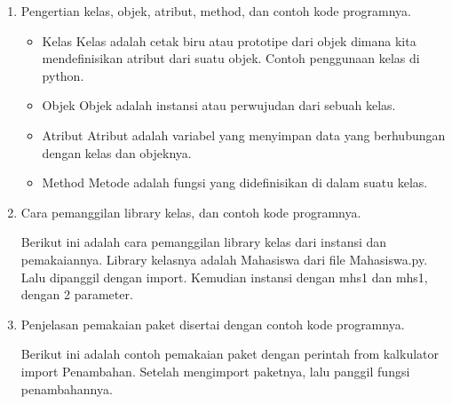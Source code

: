 \begin{enumerate}
	\item Pengertian kelas, objek, atribut, method, dan contoh kode programnya.
	
	\begin{itemize}
		\item Kelas
		Kelas adalah cetak biru atau prototipe dari objek dimana kita mendefinisikan atribut dari suatu objek.
		Contoh penggunaan kelas di python.
		
		
		\item Objek
		Objek adalah instansi atau perwujudan dari sebuah kelas.
		
		
		\item Atribut
		Atribut adalah variabel yang menyimpan data yang berhubungan dengan kelas dan objeknya.
		
		
		\item Method
		Metode adalah fungsi yang didefinisikan di dalam suatu kelas.
		
		
	\end{itemize}
	
	\item Cara pemanggilan library kelas, dan contoh kode programnya.
	
	Berikut ini adalah cara pemanggilan library kelas dari instansi dan pemakaiannya. Library kelasnya adalah Mahasiswa dari file Mahasiswa.py. Lalu dipanggil dengan import. Kemudian instansi dengan mhs1 dan mhs1, dengan 2 parameter.
	
	
	\item Penjelasan pemakaian paket disertai dengan contoh kode programnya.
	
	Berikut ini adalah contoh pemakaian paket dengan perintah from kalkulator import Penambahan. Setelah mengimport paketnya, lalu panggil fungsi penambahannya.
	
	

\end{enumerate}

